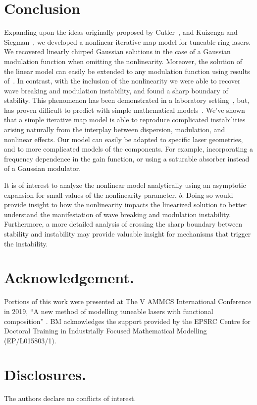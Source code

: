 \documentclass[9pt,twocolumn,twoside]{osajnl}
\begin{document}
\section{Conclusion}
\label{sec:conclusion}
Expanding upon the ideas originally proposed by Cutler~\cite{cutler1955}, and Kuizenga and Siegman~\cite{kuizenga1970, kuizenga1970a, siegman1969}, we developed a nonlinear iterative map model for tuneable ring lasers. We recovered linearly chirped Gaussian solutions in the case of a Gaussian modulation function when omitting the nonlinearity. Moreover, the solution of the linear model can easily be extended to any modulation function using results of~\cite{calcaterra2008a}. In contrast, with the inclusion of the nonlinearity we were able to recover wave breaking and modulation instability, and found a sharp boundary of stability. This phenomenon has been demonstrated in a laboratory setting~\cite{agrawal2013, anderson1992, finot2008, rothenberg1989b, tomlinson1985}, but, has proven difficult to predict with simple mathematical models~\cite{meng2020}. We've shown that a simple iterative map model is able to reproduce complicated instabilities arising naturally from the interplay between dispersion, modulation, and nonlinear effects. Our model can easily be adapted to specific laser geometries, and to more complicated models of the components. For example, incorporating a frequency dependence in the gain function, or using a saturable absorber instead of a Gaussian modulator.

It is of interest to analyze the nonlinear model analytically using an asymptotic expansion for small values of the nonlinearity parameter, $b$. Doing so would provide insight to how the nonlinearity impacts the linearized solution to better understand the manifestation of wave breaking and modulation instability. Furthermore, a more detailed analysis of crossing the sharp boundary between stability and instability may provide valuable insight for mechanisms that trigger the instability.

\section*{Acknowledgement.}

Portions of this work were presented at The V AMMCS International Conference in 2019, ``A new method of modelling tuneable lasers with functional composition'' \cite{metherallammcs}. BM acknowledges the support provided by the EPSRC Centre for Doctoral Training in Industrially Focused Mathematical Modelling (EP/L015803/1).


\section*{Disclosures.}
The authors declare no conflicts of interest.


\end{document}
